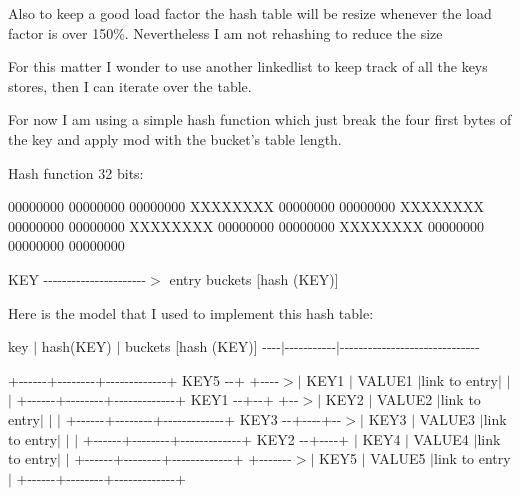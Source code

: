 \-Also to keep a good load factor the hash table will be resize whenever the load factor is over 150\%. \-Nevertheless \-I am not rehashing to reduce the size

\-For this matter \-I wonder to use another linkedlist to keep track of all the keys stores, then \-I can iterate over the table.

\-For now \-I am using a simple hash function which just break the four first bytes of the key and apply mod with the bucket's table length.

\-Hash function 32 bits\-:

00000000 00000000 00000000 \-X\-X\-X\-X\-X\-X\-X\-X 00000000 00000000 \-X\-X\-X\-X\-X\-X\-X\-X 00000000 00000000 \-X\-X\-X\-X\-X\-X\-X\-X 00000000 00000000 \-X\-X\-X\-X\-X\-X\-X\-X 00000000 00000000 00000000

\-K\-E\-Y -\/-\/-\/-\/-\/-\/-\/-\/-\/-\/-\/-\/-\/-\/-\/-\/-\/-\/-\/-\/-\/-\/$>$ entry buckets \mbox{[}hash (\-K\-E\-Y)\mbox{]}

\-Here is the model that \-I used to implement this hash table\-:

key $|$ hash(\-K\-E\-Y) $|$ buckets \mbox{[}hash (\-K\-E\-Y)\mbox{]} -\/-\/-\/-\/$|$-\/-\/-\/-\/-\/-\/-\/-\/-\/-\/-\/$|$-\/-\/-\/-\/-\/-\/-\/-\/-\/-\/-\/-\/-\/-\/-\/-\/-\/-\/-\/-\/-\/-\/-\/-\/-\/-\/-\/-\/-\/-\/

+-\/-\/-\/-\/-\/-\/+-\/-\/-\/-\/-\/-\/-\/-\/+-\/-\/-\/-\/-\/-\/-\/-\/-\/-\/-\/-\/-\/+ \-K\-E\-Y5 -\/-\/+ +-\/-\/-\/-\/$>$$|$ \-K\-E\-Y1 $|$ \-V\-A\-L\-U\-E1 $|$link to entry$|$ $|$ $|$ +-\/-\/-\/-\/-\/-\/+-\/-\/-\/-\/-\/-\/-\/-\/+-\/-\/-\/-\/-\/-\/-\/-\/-\/-\/-\/-\/-\/+ \-K\-E\-Y1 -\/-\/+-\/-\/+ +-\/-\/$>$$|$ \-K\-E\-Y2 $|$ \-V\-A\-L\-U\-E2 $|$link to entry$|$ $|$ $|$ +-\/-\/-\/-\/-\/-\/+-\/-\/-\/-\/-\/-\/-\/-\/+-\/-\/-\/-\/-\/-\/-\/-\/-\/-\/-\/-\/-\/+ \-K\-E\-Y3 -\/-\/+-\/-\/-\/-\/+-\/-\/$>$$|$ \-K\-E\-Y3 $|$ \-V\-A\-L\-U\-E3 $|$link to entry$|$ $|$ $|$ +-\/-\/-\/-\/-\/-\/+-\/-\/-\/-\/-\/-\/-\/-\/+-\/-\/-\/-\/-\/-\/-\/-\/-\/-\/-\/-\/-\/+ \-K\-E\-Y2 -\/-\/+-\/-\/-\/-\/+ $|$ \-K\-E\-Y4 $|$ \-V\-A\-L\-U\-E4 $|$link to entry$|$ $|$ +-\/-\/-\/-\/-\/-\/+-\/-\/-\/-\/-\/-\/-\/-\/+-\/-\/-\/-\/-\/-\/-\/-\/-\/-\/-\/-\/-\/+ +-\/-\/-\/-\/-\/-\/-\/$>$$|$ \-K\-E\-Y5 $|$ \-V\-A\-L\-U\-E5 $|$link to entry$|$ +-\/-\/-\/-\/-\/-\/+-\/-\/-\/-\/-\/-\/-\/-\/+-\/-\/-\/-\/-\/-\/-\/-\/-\/-\/-\/-\/-\/+ 